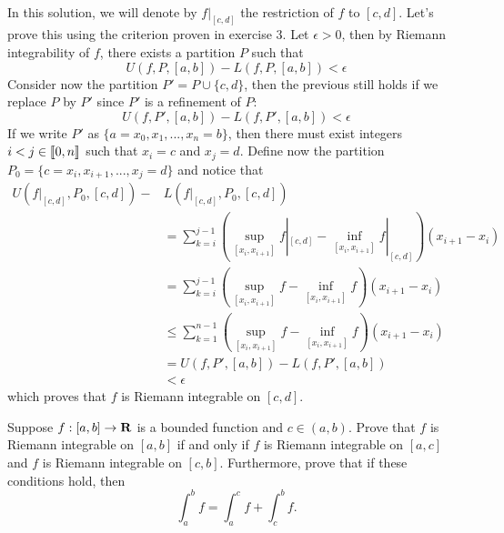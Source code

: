 \begin{solution}
    \\ In this solution, we will denote by $f|_{[c,d]}$ the restriction of $f$ to $[c,d]$. Let's prove this using the criterion proven in exercise 3. Let $\epsilon > 0$, then by Riemann integrability of $f$, there exists a partition $P$ such that
    $$U(f, P, [a,b]) - L(f, P, [a,b]) < \epsilon$$
    Consider now the partition $P' = P \cup \{c, d\}$, then the previous still holds if we replace $P$ by $P'$ since $P'$ is a refinement of $P$:
    $$U(f, P', [a,b]) - L(f, P', [a,b]) < \epsilon$$
    If we write $P'$ as $\{a= x_0, x_1, ..., x_n = b\}$, then there must exist integers $i < j \in \llbracket 0 , n \rrbracket$ such that $x_i = c$ and $x_j = d$. Define now the partition $P_0 = \{c = x_i, x_{i+1}, ..., x_j = d\}$ and notice that
    \begin{align*}
        U(f|_{[c,d]}, P_0, [c,d]) - &L(f|_{[c,d]}, P_0, [c,d]) \\ &= \sum_{k=i}^{j-1}\left(\sup_{[x_i, x_{i+1}]}f|_{[c,d]} - \inf_{[x_i, x_{i+1}]}f|_{[c,d]}\right)(x_{i+1} - x_i) \\
        &= \sum_{k=i}^{j-1}\left(\sup_{[x_i, x_{i+1}]}f - \inf_{[x_i, x_{i+1}]}f\right)(x_{i+1} - x_i) \\
        &\leq \sum_{k=1}^{n-1}\left(\sup_{[x_i, x_{i+1}]}f - \inf_{[x_i, x_{i+1}]}f\right)(x_{i+1} - x_i) \\
        &= U(f, P', [a,b]) - L(f, P', [a,b]) \\
        &< \epsilon
    \end{align*} 
    which proves that $f$ is Riemann integrable on $[c,d]$. \\
\end{solution}

\begin{exercise}
    Suppose $f : [a,b] \to \mathbf{R}$ is a bounded function and $c \in (a,b)$. Prove that $f$ is Riemann integrable on $[a,b]$ if and only if $f$ is Riemann integrable on $[a,c]$ and $f$ is Riemann integrable on $[c,b]$. Furthermore, prove that if these conditions hold, then
    $$\int_{a}^{b}f = \int_{a}^{c}f + \int_{c}^{b}f.$$
\end{exercise}

